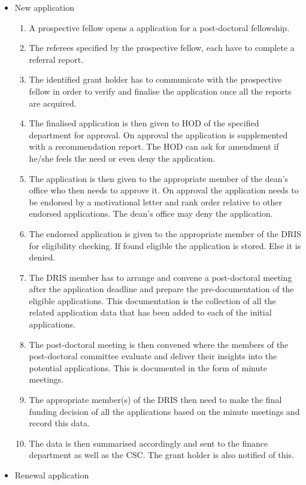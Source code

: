 \documentclass[12pt]{article}
\begin{document}
\begin{itemize}
	\item New application
		\begin{enumerate}
			\item A prospective fellow opens a application for a post-doctoral fellowship.
			\item The referees specified by the prospective fellow, each have to complete a referral report.
			\item The identified grant holder has to communicate with the prospective fellow in order to verify and finalise the application once all the reports are acquired.
			\item The finalised application is then given to HOD of the specified department for approval. On approval the application is supplemented with a recommendation report. The HOD can ask for amendment if he/she feels the need or even deny the application.
			\item The application is then given to the appropriate member of the dean's office who then needs to approve it. On approval the application needs to be endorsed by a motivational letter and rank order relative to other endorsed applications. The dean's office may deny the application.
			\item The endorsed application is given to the appropriate member of the DRIS for eligibility checking. If found eligible the application is stored. Else it is denied.
			\item The DRIS member has to arrange and convene a post-doctoral meeting after the application deadline and prepare the pre-documentation of the eligible applications. This documentation is the collection of all the related application data that has been added to each of the initial applications.
			\item The post-doctoral meeting is then convened where the members of the post-doctoral committee evaluate and deliver their insights into the potential applications. This is documented in the form of minute meetings. 
			\item The appropriate member(s) of the DRIS then need to make the final funding decision of all the applications based on the minute meetings and record this data.
			\item The data is then summarised accordingly and sent to the finance department as well as the CSC. The grant holder is also notified of this.   
		\end{enumerate}
	\item Renewal application

\end{itemize}
\end{document}
